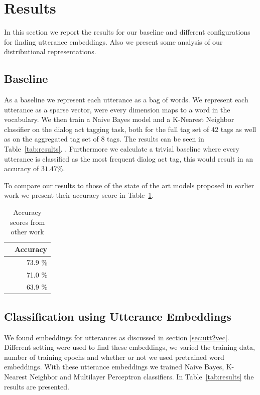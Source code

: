 \section{Results}\label{sec:results}
In this section we report the results for our baseline and different configurations for finding utterance embeddings.
Also we present some analysis of our distributional representations.

\subsection{Baseline}
As a baseline we represent each utterance as a bag of words.
We represent each utterance as a sparse vector, were every dimension maps to a word in the vocabulary.
We then train a Naive Bayes model and a K-Nearest Neighbor classifier on the dialog act tagging task, both for the full tag set of 42 tags as well as on the aggregated tag set of 8 tags.
The results can be seen in Table~\ref{tab:results}. .
Furthermore we calculate a trivial baseline where every utterance is classified as the most frequent dialog act tag, this would result in an accuracy of $31.47\%$.

To compare our results to those of the state of the art models proposed in earlier work we present their accuracy score in Table~\ref{tab:sota}.
\begin{table}[t]
	\centering
	\begin{tabular}{l|r}
		& \textbf{Accuracy} \\ \hline
		\newcite{kalchbrenner} & 73.9 \%           \\
		\newcite{stolcke2000}  & 71.0 \%           \\
		\newcite{milajevs}     & 63.9 \%          
	\end{tabular}
		\caption{Accuracy scores from other work}
		\label{tab:sota}
\end{table}

\subsection{Classification using Utterance Embeddings}
We found embeddings for utterances as discussed in section \ref{sec:utt2vec}.
Different setting were used to find these embeddings, we varied the training data, number of training epochs and whether or not we used pretrained word embeddings.
With these utterance embeddings we trained Naive Bayes, K-Nearest Neighbor and Multilayer Perceptron classifiers.
In Table~\ref{tab:results} the results are presented. 

